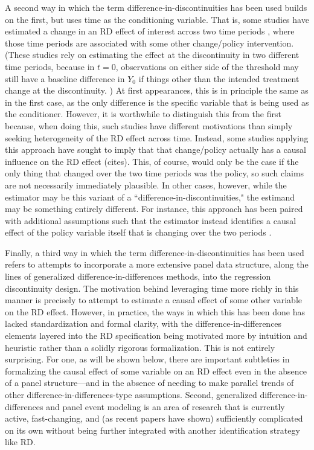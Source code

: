 \documentclass[12pt]{article}
\begin{document}
A second way in which the term difference-in-discontinuities has been used builds on the first, but uses time as the conditioning variable. That is, some studies have estimated a change in an RD effect of interest across two time periods \citep{grembi2016fiscal, chicoine2017, debenedetto2019, kantorowicz2019, koppl-turyna2020},
where those time periods are associated with some other change/policy intervention. 
(These studies rely on estimating the effect at the discontinuity in two different time periods, because in $t = 0$, observations on either side of the threshold may still have a baseline difference in $Y_0$ if things other than the intended treatment change at the discontinuity. )
At first appearances, this is in principle the same as in the first case, as the only difference is the specific variable that is being used as the conditioner. However, it is worthwhile to distinguish this from the first because, when doing this, such studies have different motivations than simply seeking heterogeneity of the RD effect across time. Instead, some studies applying this approach have sought to imply that that change/policy actually has a causal influence on the RD effect (cites). This, of course, would only be the case if the only thing that changed over the two time periods was the policy, so such claims are not necessarily immediately plausible. In other cases, however, while the estimator may be this variant of a ``difference-in-discontinuities," the estimand may be something entirely different. For instance, this approach has been paired with additional assumptions such that the estimator instead identifies a causal effect of the policy variable itself that is changing over the two periods \citep{grembi2016fiscal}.

Finally, a third way in which the term difference-in-discontinuities has been used refers to attempts to incorporate a more extensive panel data structure, along the lines of generalized difference-in-differences methods, into the regression discontinuity design. The motivation behind leveraging time more richly in this manner is precisely to attempt to estimate a causal effect of some other variable on the RD effect. However, in practice, the ways in which this has been done has lacked standardization and formal clarity, with the difference-in-differences elements layered into the RD specification being motivated more by intuition and heuristic rather than a solidly rigorous formalization. This is not entirely surprising. For one, as will be shown below, there are important subtleties in formalizing the causal effect of some variable on an RD effect even in the absence of a panel structure---and in the absence of needing to make parallel trends of other difference-in-differences-type assumptions. Second, generalized difference-in-differences and panel event modeling is an area of research that is currently active, fast-changing, and (as recent papers have shown) sufficiently complicated on its own without being further integrated with another identification strategy like RD.
\end{document}
